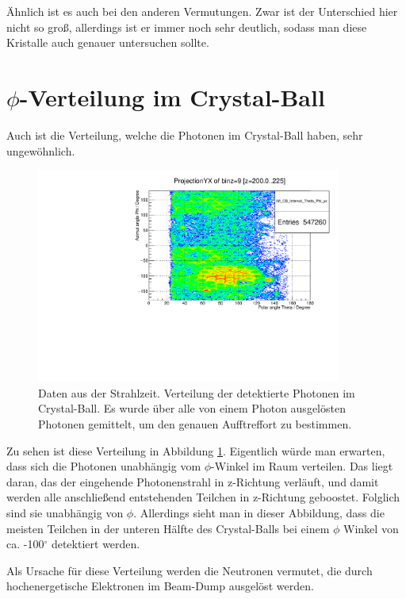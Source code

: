 \documentclass[a4paper,11pt,oneside,final,german,openbib,pdftex]{scrbook}
\begin{document}
{ \"Ahnlich ist es auch bei den anderen Vermutungen. Zwar ist der Unterschied hier nicht so gro{\ss}, allerdings ist er immer noch sehr deutlich, sodass man diese Kristalle auch genauer untersuchen sollte.
 \newpage

\section{$\phi$-Verteilung im Crystal-Ball}

Auch ist die Verteilung, welche die Photonen im Crystal-Ball haben, sehr ungew\"ohnlich.

\begin{figure}[h!]
	\begin{center}
		\includegraphics[width=100mm]{NewCalib/ThetaPhiVerteilung/20172404ThetaPhi200MeVBeam}
		\caption[Strahlzeit: Symmetrische Photonen; Verteilung der detektierten Photonen im CB]{Daten aus der Strahlzeit. Verteilung der detektierte Photonen im Crystal-Ball. Es wurde \"uber alle von einem Photon ausgel\"osten Photonen gemittelt, um den genauen Aufftreffort zu bestimmen.}
		\label{fig:Verteilung-der-Photonen-im-CB}
	\end{center}
\end{figure}
Zu sehen ist diese Verteilung in Abbildung \ref{fig:Verteilung-der-Photonen-im-CB}. Eigentlich w\"urde man erwarten, dass sich die Photonen unabh\"angig vom $\phi$-Winkel im Raum verteilen. Das liegt daran, das der eingehende Photonenstrahl in z-Richtung verl\"auft, und damit werden alle anschlie{\ss}end entstehenden Teilchen in z-Richtung geboostet. Folglich sind sie unabh\"angig von $\phi$. 
Allerdings sieht man in dieser Abbildung, dass die meisten Teilchen in der unteren H\"alfte des Crystal-Balls bei einem $\phi$ Winkel von ca. -100$^{\circ}$ detektiert werden.

Als Ursache f\"ur diese Verteilung werden die Neutronen vermutet, die durch hochenergetische Elektronen im Beam-Dump ausgel\"ost werden. 

}
\end{document}
